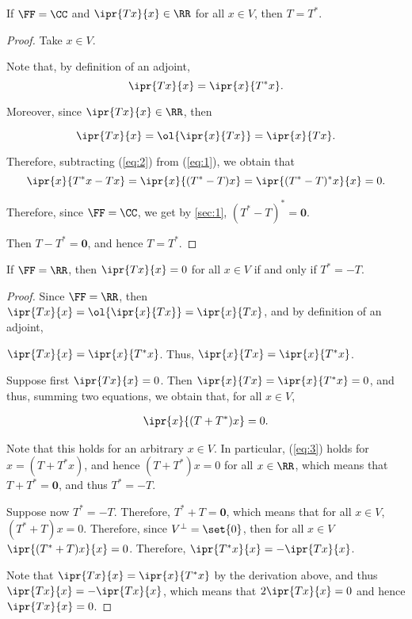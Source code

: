 \documentclass[11pt]{scrartcl}
\begin{document}
\begin{lemma}
  If $\FF = \CC$ and $\ipr{Tx}{x}\in\RR$ for all $x\in V$, then $T = T^{*}$.
\end{lemma}
\begin{proof}
  \hfill

  Take $x\in V$.
  
  Note that, by definition of an adjoint,
  \begin{equation}
    \label{eq:1}
    \ipr{Tx}{x}=\ipr{x}{T^{*}x}.
  \end{equation}

  Moreover, since $\ipr{Tx}{x}\in \RR$, then

  \begin{equation}
    \label{eq:2}
  \ipr{Tx}{x}=\ol{\ipr{x}{Tx}} = \ipr{x}{Tx}.
  \end{equation}

  Therefore, subtracting (\ref{eq:2}) from (\ref{eq:1}), we obtain that
  \begin{equation}
    \ipr{x}{T^{*}x-Tx} = \ipr{x}{(T^{*}-T)x} = \ipr{(T^{*}-T)^{*}x}{x}=0.
  \end{equation}

  Therefore, since $\FF = \CC$, we get by \ref{sec:1},
  $(T^{*}-T)^{*} =\bm{0}$.

  Then $T - T^{*}=\bm{0}$, and hence $T = T^{*}$.
\end{proof}

\begin{lemma}
  If $\FF = \RR$, then $\ipr{Tx}{x}=0$ for all $x\in V$ if and only if $T^{*} = -T$.
\end{lemma}

\begin{proof}
  \hfill

  Since $\FF = \RR$, then
  $\ipr{Tx}{x}=\ol{\ipr{x}{Tx}} = \ipr{x}{Tx}$, and by definition of
  an adjoint,

  $\ipr{Tx}{x}= \ipr{x}{T^{*}x}$. Thus, $\ipr{x}{Tx} = \ipr{x}{T^{*}x}$.

  Suppose first $\ipr{Tx}{x}=0$. Then
  $\ipr{x}{Tx} = \ipr{x}{T^{*}x} = 0$, and thus, summing two
  equations, we obtain that, for all $x\in V$,

  \begin{align}
    \label{eq:3}
    \ipr{x}{(T+T^{*})x} = 0.
  \end{align}

  Note that this holds for an arbitrary $x\in V$. In particular,
  (\ref{eq:3}) holds for $x=(T+T^{*}x)$, and hence $(T+T^{*})x = 0$ for
  all $x\in\RR$, which means that $T +T^{*}= \bm{0}$, and thus $T^{*} = -T$.

  Suppose now $T^{*}=-T$. Therefore, $T^{*}+T = \bm{0}$, which means
  that for all $x\in V$, $(T^{*}+T)x = 0$. Therefore, since
  $V^{\bot} = \set{0}$, then for all $x\in V$
  $\ipr{(T^{*}+T)x}{x} = 0$. Therefore, $\ipr{T^{*}x}{x}=-\ipr{Tx}{x}$.

  Note that $\ipr{Tx}{x}= \ipr{x}{T^{*}x}$ by the derivation above,
  and thus $\ipr{Tx}{x} = -\ipr{Tx}{x}$, which means that
  $2\ipr{Tx}{x}=0$ and hence $\ipr{Tx}{x}=0$.
\end{proof}
\end{document}
